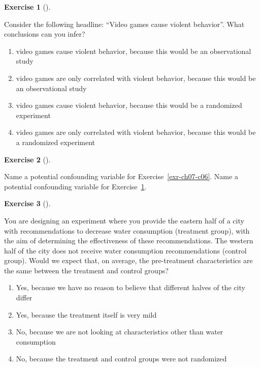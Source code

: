 \documentclass[
  letterpaper,
  DIV=11,
  numbers=noendperiod]{scrreprt}
\providecommand{\tightlist}{%
  \setlength{\itemsep}{0pt}\setlength{\parskip}{0pt}}\usepackage{longtable,booktabs,array}
\theoremstyle{definition}
\newtheorem{exercise}{Exercise}[chapter]
\theoremstyle{remark}
\begin{document}
\begin{exercise}[]\protect\hypertarget{exr-ch07-c07}{}\label{exr-ch07-c07}

Consider the following headline: ``Video games cause violent behavior''.
What conclusions can you infer?

\begin{enumerate}
\def\labelenumi{\alph{enumi})}
\tightlist
\item
  video games cause violent behavior, because this would be an
  observational study
\item
  video games are only correlated with violent behavior, because this
  would be an observational study
\item
  video games cause violent behavior, because this would be a randomized
  experiment
\item
  video games are only correlated with violent behavior, because this
  would be a randomized experiment
\end{enumerate}

\end{exercise}

\begin{exercise}[]\protect\hypertarget{exr-ch07-c08}{}\label{exr-ch07-c08}

Name a potential confounding variable for Exercise~\ref{exr-ch07-c06}.
Name a potential confounding variable for Exercise~\ref{exr-ch07-c07}.

\end{exercise}

\begin{exercise}[]\protect\hypertarget{exr-ch07-c09}{}\label{exr-ch07-c09}

You are designing an experiment where you provide the eastern half of a
city with recommendations to decrease water consumption (treatment
group), with the aim of determining the effectiveness of these
recommendations. The western half of the city does not receive water
consumption recommendations (control group). Would we expect that, on
average, the pre-treatment characteristics are the same between the
treatment and control groups?

\begin{enumerate}
\def\labelenumi{\alph{enumi})}
\tightlist
\item
  Yes, because we have no reason to believe that different halves of the
  city differ
\item
  Yes, because the treatment itself is very mild
\item
  No, because we are not looking at characteristics other than water
  consumption
\item
  No, because the treatment and control groups were not randomized
\end{enumerate}

\end{exercise}
\end{document}
